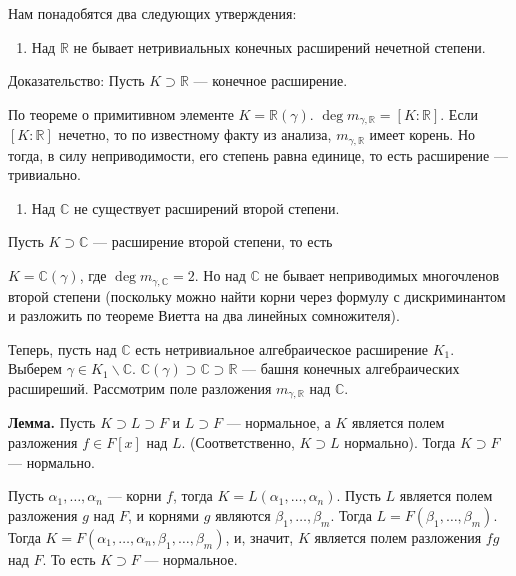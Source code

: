\begin{solution}
Нам понадобятся два следующих утверждения:

\begin{enumerate}
\def\labelenumi{\arabic{enumi})}
\tightlist
\item
  Над \(\mathbb{R}\) не бывает нетривиальных конечных расширений нечетной степени.
\end{enumerate}

Доказательство: Пусть \(K \supset \mathbb{R}\) --- конечное расширение.

По теореме о примитивном элементе \(K = \mathbb{R}(\gamma)\). \(\deg m_{\gamma, \mathbb{R}} = [K : \mathbb{R}]\). Если \([K : \mathbb{R}]\) нечетно, то по известному факту из анализа, \(m_{\gamma, \mathbb{R}}\) имеет корень. Но тогда, в силу неприводимости, его степень равна единице, то есть расширение --- тривиально.

\begin{enumerate}
\def\labelenumi{\arabic{enumi})}
\setcounter{enumi}{1}
\tightlist
\item
  Над \(\mathbb{C}\) не существует расширений второй степени.
\end{enumerate}

Пусть \(K \supset \mathbb{C}\) --- расширение второй степени, то есть

\(K = \mathbb{C}(\gamma)\), где \(\deg m_{\gamma, \mathbb{C}} = 2\). Но над \(\mathbb{C}\) не бывает неприводимых многочленов второй степени (поскольку можно найти корни через формулу с дискриминантом и разложить по теореме Виетта на два линейных сомножителя).

Теперь, пусть над \(\mathbb{C}\) есть нетривиальное алгебраическое расширение \(K_1\). Выберем \(\gamma \in K_1 \backslash \mathbb{C}\). \(\mathbb{C}(\gamma) \supset \mathbb{C} \supset \mathbb{R}\) --- башня конечных алгебраических расширеший. Рассмотрим поле разложения \(m_{\gamma, \mathbb{R}}\) над \(\mathbb{C}\).

\textbf{Лемма.} Пусть \(K \supset L \supset F\) и \(L \supset F\) --- нормальное, а \(K\) является полем разложения \(f \in F[x]\) над \(L\). (Соответственно, \(K \supset L\) нормально). Тогда \(K \supset F\) --- нормально.

Пусть \(\alpha_1, \ldots, \alpha_n\) --- корни \(f\), тогда \(K = L(\alpha_1, \ldots, \alpha_n)\). Пусть \(L\) является полем разложения \(g\) над \(F\), и корнями \(g\) являются \(\beta_1, \ldots, \beta_m\). Тогда \(L = F(\beta_1, \ldots, \beta_m)\). Тогда \(K = F(\alpha_1, \ldots, \alpha_n, \beta_1, \ldots, \beta_m)\), и, значит, \(K\) является полем разложения \(fg\) над \(F\). То есть \(K \supset F\) --- нормальное.


\end{solution}
